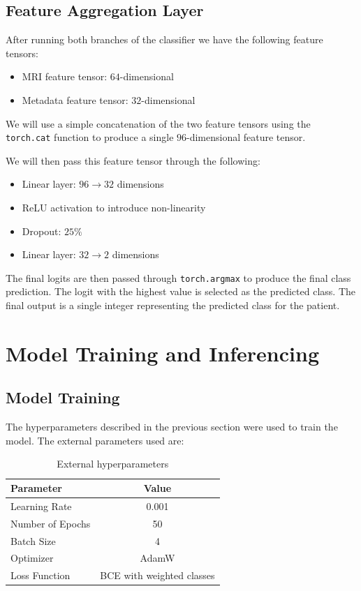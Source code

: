 \documentclass[10pt,twocolumn]{article}
\begin{document}
    \subsection{Feature Aggregation Layer}
        After running both branches of the classifier we have the following feature tensors:
        \begin{itemize}[noitemsep]
            \item MRI feature tensor: $64$-dimensional
            \item Metadata feature tensor: $32$-dimensional
        \end{itemize}

        \noindent
        We will use a simple concatenation of the two feature tensors using the \texttt{torch.cat} function to produce a single $96$-dimensional feature tensor. 

        \noindent
        We will then pass this feature tensor through the following:
        \begin{itemize}[noitemsep]
            \item Linear layer: $96 \rightarrow 32$ dimensions
            \item ReLU activation to introduce non-linearity
            \item Dropout: $25\%$
            \item Linear layer: $32 \rightarrow 2$ dimensions
        \end{itemize}

        \noindent
        The final logits are then passed through \texttt{torch.argmax} to produce the final class prediction. The logit with the highest value is selected as the predicted class. The final output is a single integer representing the predicted class for the patient.
    
    \section{Model Training and Inferencing}
    \subsection{Model Training}
    The hyperparameters described in the previous section were used to train the model. The external parameters used are:

    \begin{table}[H]
        \centering
        \begin{tabular}{l c}
            \hline
            \textbf{Parameter} & \textbf{Value} \\
            \hline
            Learning Rate & 0.001 \\
            Number of Epochs & 50 \\
            Batch Size & 4 \\
            Optimizer & AdamW \\
            Loss Function & BCE with weighted classes \\
            \hline
        \end{tabular}
        \caption{External hyperparameters}
        \label{tab:hyperparameters}
    \end{table}
\end{document}
